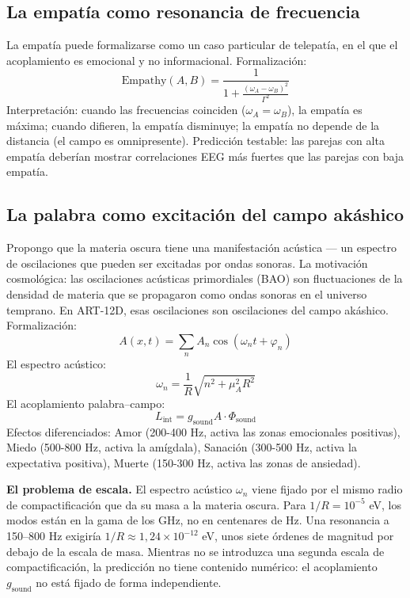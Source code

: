 \subsection{La empatía como resonancia de frecuencia}
La empatía puede formalizarse como un caso particular de telepatía, en el que el acoplamiento es emocional y no informacional. Formalización:
\begin{equation}
\text{Empathy}(A,B) = \frac{1}{1 + \frac{(\omega_A - \omega_B)^2}{\Gamma^2}}
\end{equation}
Interpretación: cuando las frecuencias coinciden ($\omega_A = \omega_B$), la empatía es máxima; cuando difieren, la empatía disminuye; la empatía no depende de la distancia (el campo es omnipresente). Predicción testable: las parejas con alta empatía deberían mostrar correlaciones EEG más fuertes que las parejas con baja empatía.

\subsection{La palabra como excitación del campo akáshico}
Propongo que la materia oscura tiene una manifestación acústica --- un espectro de oscilaciones que pueden ser excitadas por ondas sonoras. La motivación cosmológica: las oscilaciones acústicas primordiales (BAO) son fluctuaciones de la densidad de materia que se propagaron como ondas sonoras en el universo temprano. En ART-12D, esas oscilaciones son oscilaciones del campo akáshico. Formalización:
\begin{equation}
A(x,t) = \sum_n A_n \cos(\omega_n t + \varphi_n)
\end{equation}
El espectro acústico:
\begin{equation}
\omega_n = \frac{1}{R} \sqrt{n^2 + \mu_A^2 R^2}
\end{equation}
El acoplamiento palabra--campo:
\begin{equation}
L_{\text{int}} = g_{\text{sound}} A \cdot \Phi_{\text{sound}}
\end{equation}
Efectos diferenciados: Amor (200-400 Hz, activa las zonas emocionales positivas), Miedo (500-800 Hz, activa la amígdala), Sanación (300-500 Hz, activa la expectativa positiva), Muerte (150-300 Hz, activa las zonas de ansiedad).

\textbf{El problema de escala.} El espectro acústico $\omega_n$ viene fijado por el mismo radio de compactificación que da su masa a la materia oscura. Para $1/R = 10^{-5}$ eV, los modos están en la gama de los GHz, no en centenares de Hz. Una resonancia a 150--800 Hz exigiría $1/R \approx 1,24\times10^{-12}$ eV, unos siete órdenes de magnitud por debajo de la escala de masa. Mientras no se introduzca una segunda escala de compactificación, la predicción no tiene contenido numérico: el acoplamiento $g_{\text{sound}}$ no está fijado de forma independiente.

